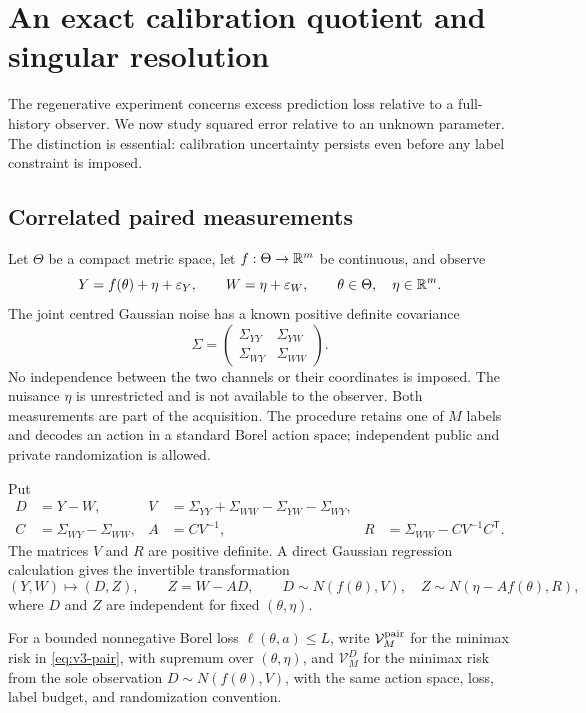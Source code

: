 \section{An exact calibration quotient and singular resolution}
\label{sec:v3-calibration}
The regenerative experiment concerns excess prediction loss relative to a
full-history observer. We now study squared error relative to an unknown
parameter. The distinction is essential: calibration uncertainty persists
even before any label constraint is imposed.

\subsection{Correlated paired measurements}
Let $\Theta$ be a compact metric space, let $f:\Theta\to\mathbb R^m$ be
continuous, and observe
\begin{equation}\label{eq:v3-pair}
 Y=f(\theta)+\eta+\varepsilon_Y,\qquad
 W=\eta+\varepsilon_W,
 \qquad \theta\in\Theta,\quad\eta\in\mathbb R^m.
\end{equation}
The joint centred Gaussian noise has a known positive definite covariance
\[
 \Sigma=\begin{pmatrix}\Sigma_{YY}&\Sigma_{YW}\\
                         \Sigma_{WY}&\Sigma_{WW}\end{pmatrix}.
\]
No independence between the two channels or their coordinates is imposed.
The nuisance $\eta$ is unrestricted and is not available to the observer.
Both measurements are part of the acquisition. The procedure retains one
of $M$ labels and decodes an action in a standard Borel action space;
independent public and private randomization is allowed.

Put
\begin{align}
 D&=Y-W,&
 V&=\Sigma_{YY}+\Sigma_{WW}-\Sigma_{YW}-\Sigma_{WY},\label{eq:v3-difference}\\
 C&=\Sigma_{WY}-\Sigma_{WW},& A&=CV^{-1},&
 R&=\Sigma_{WW}-CV^{-1}C^{\mathsf T}.\label{eq:v3-schur}
\end{align}
The matrices $V$ and $R$ are positive definite. A direct Gaussian
regression calculation gives the invertible transformation
\begin{equation}\label{eq:v3-orthogonal-pair}
 (Y,W)\longmapsto (D,Z),\qquad Z=W-AD,
 \qquad
 D\sim N(f(\theta),V),\quad
 Z\sim N(\eta-Af(\theta),R),
\end{equation}
where $D$ and $Z$ are independent for fixed $(\theta,\eta)$.

For a bounded nonnegative Borel loss $\ell(\theta,a)\le L$, write
$\mathcal V_M^{\rm pair}$ for the minimax risk in
\eqref{eq:v3-pair}, with supremum over $(\theta,\eta)$, and
$\mathcal V_M^{D}$ for the minimax risk from the sole observation
$D\sim N(f(\theta),V)$, with the same action space, loss, label budget,
and randomization convention.

